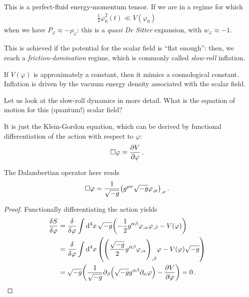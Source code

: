 \documentclass[main.tex]{subfiles}
\begin{document}
This is a perfect-fluid energy-momentum tensor. 
If we are in a regime for which 
%
\begin{align}
\frac{1}{2} \dot{\varphi}_0^2 (t) \ll V(\varphi_0 )
\,
\end{align}
%
when we have \(P_\varphi \approx - \rho _\varphi \): this is a \emph{quasi De Sitter} expansion, with \(w_\varphi \approx -1\). 

This is achieved if the potential for the scalar field is ``flat enough'': then, we reach a \emph{friction-domination} regime, which is commonly called \emph{slow-roll} inflation. 


If \(V(\varphi )\) is approximately a constant, then it mimics a cosmological constant. 
Inflation is driven by the vacuum energy density associated with the scalar field. 

Let us look at the slow-roll dynamics in more detail. 
What is the equation of motion for this (quantum!) scalar field?

\begin{claim}

It is just the Klein-Gordon equation, which can be derived by functional differentiation of the action with respect to \(\varphi \): 
%
\begin{align}
\square \varphi = \pdv{V}{\varphi }
\,.
\end{align}
\end{claim}

The Dalambertian operator here reads 
%
\begin{align}
\square \varphi = \frac{1}{\sqrt{-g}} \qty(g^{\mu \nu } \sqrt{-g} \varphi_{, \mu })_{, \nu }
\,.
\end{align}

\begin{proof}
Functionally differentiating the action yields
%
\begin{align}
\fdv{S}{\varphi } &= \fdv{}{\varphi } \int \dd[4]{x} \sqrt{-g} \qty(- \frac{1}{2} g^{\alpha \beta } \varphi_{, \alpha } \varphi_{, \beta } - V(\varphi ))  \\
&= \fdv{}{\varphi } \int \dd[4]{x} \qty(\qty( \frac{\sqrt{-g}}{2} g^{\alpha \beta } \varphi_{, \alpha })_{,\beta } \varphi  - V(\varphi ) \sqrt{-g})  \\
&= \sqrt{-g} \qty( \frac{1}{\sqrt{-g}} \partial_{\beta } \qty( \sqrt{-g} g^{\alpha \beta } \partial_{\alpha } \varphi ) - \pdv{V}{\varphi }) = 0
\,.
\end{align}


\end{proof}
\end{document}
